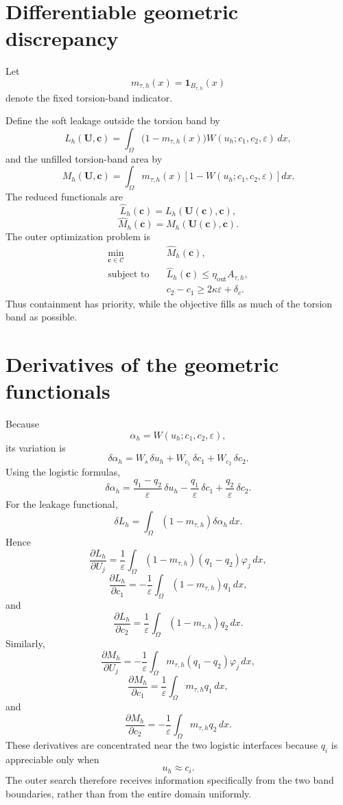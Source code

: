 \documentclass[11pt]{article}
\newcommand{\cC}{\mathcal{C}}
\newcommand{\bU}{\mathbf{U}}
\newcommand{\bc}{\mathbf{c}}
\begin{document}
\section{Differentiable geometric discrepancy}

Let
\[
m_{\tau,h}(x)=\mathbf{1}_{B_{\tau,h}}(x)
\]
denote the fixed torsion-band indicator.

Define the soft leakage outside the torsion band by
\[
L_h(\bU,\bc)
=
\int_\Omega
\bigl(1-m_{\tau,h}(x)\bigr)
W(u_h;c_1,c_2,\varepsilon)\,dx,
\]
and the unfilled torsion-band area by
\[
M_h(\bU,\bc)
=
\int_\Omega
m_{\tau,h}(x)
\left[
1-W(u_h;c_1,c_2,\varepsilon)
\right]dx.
\]
The reduced functionals are
\[
\widehat L_h(\bc)
=
L_h(\bU(\bc),\bc),
\]
\[
\widehat M_h(\bc)
=
M_h(\bU(\bc),\bc).
\]
The outer optimization problem is
\[
\boxed{
\begin{aligned}
\min_{\bc\in\cC}\quad&
\widehat M_h(\bc),
\\
\text{subject to}\quad&
\widehat L_h(\bc)
\leq
\eta_{\mathrm{out}}A_{\tau,h},
\\
&
c_2-c_1
\geq
2\kappa\varepsilon+\delta_c.
\end{aligned}}
\]
Thus containment has priority, while the objective fills as much of the torsion band as possible.

\section{Derivatives of the geometric functionals}

Because
\[
\alpha_h=W(u_h;c_1,c_2,\varepsilon),
\]
its variation is
\[
\delta\alpha_h
=
W_s\,\delta u_h
+
W_{c_1}\,\delta c_1
+
W_{c_2}\,\delta c_2.
\]
Using the logistic formulas,
\[
\delta\alpha_h
=
\frac{q_1-q_2}{\varepsilon}\,\delta u_h
-
\frac{q_1}{\varepsilon}\,\delta c_1
+
\frac{q_2}{\varepsilon}\,\delta c_2.
\]
For the leakage functional,
\[
\delta L_h
=
\int_\Omega
(1-m_{\tau,h})
\delta\alpha_h\,dx.
\]
Hence
\[
\frac{\partial L_h}{\partial U_j}
=
\frac{1}{\varepsilon}
\int_\Omega
(1-m_{\tau,h})(q_1-q_2)\varphi_j\,dx,
\]
\[
\frac{\partial L_h}{\partial c_1}
=
-\frac{1}{\varepsilon}
\int_\Omega
(1-m_{\tau,h})q_1\,dx,
\]
and
\[
\frac{\partial L_h}{\partial c_2}
=
\frac{1}{\varepsilon}
\int_\Omega
(1-m_{\tau,h})q_2\,dx.
\]
Similarly,
\[
\frac{\partial M_h}{\partial U_j}
=
-\frac{1}{\varepsilon}
\int_\Omega
m_{\tau,h}(q_1-q_2)\varphi_j\,dx,
\]
\[
\frac{\partial M_h}{\partial c_1}
=
\frac{1}{\varepsilon}
\int_\Omega
m_{\tau,h}q_1\,dx,
\]
and
\[
\frac{\partial M_h}{\partial c_2}
=
-\frac{1}{\varepsilon}
\int_\Omega
m_{\tau,h}q_2\,dx.
\]
These derivatives are concentrated near the two logistic interfaces because $q_i$ is appreciable only when
\[
u_h\approx c_i.
\]
The outer search therefore receives information specifically from the two band boundaries, rather than from the entire domain uniformly.
\end{document}
